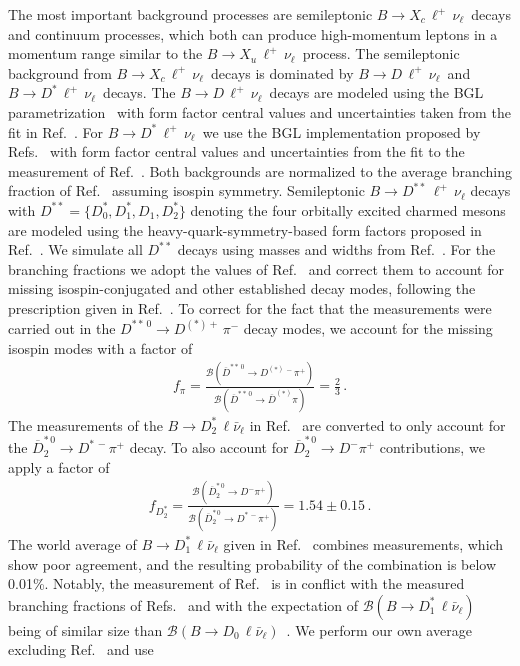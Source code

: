 \documentclass[twocolumn,aps,prd,superscriptaddress,nofootinbib,floatfix,preprintnumbers,a4]{revtex4-1}
\newcommand{\bulnu}{\ensuremath{B \to X_u \, \ell^+\, \nu_{\ell}}\xspace}
\newcommand{\bclnu}{\ensuremath{B \to X_c \, \ell^+\, \nu_{\ell}}\xspace}
\newcommand{\bdlnu}{\ensuremath{B \to D \, \ell^+\,\nu_{\ell}}\xspace}
\newcommand{\bdslnu}{\ensuremath{B \to D^* \, \ell^+\,\nu_{\ell}}\xspace}
\newcommand{\bddslnu}{\ensuremath{B \to D^{**} \, \ell^+\,\nu_{\ell}}\xspace}
\begin{document}
The most important background processes are semileptonic \bclnu\ decays and continuum processes, which both can produce high-momentum leptons in a momentum range similar to the \bulnu\ process. The semileptonic background from \bclnu\ decays is dominated by \bdlnu\ and \bdslnu\ decays. The \bdlnu\ decays are modeled using the BGL parametrization~\cite{Boyd:1994tt} with form factor central values and uncertainties taken from the fit in Ref.~\cite{Glattauer:2015teq}. For \bdslnu\, we use the BGL implementation proposed by Refs.~\cite{Grinstein:2017nlq,Bigi:2017njr} with form factor central values and uncertainties from the fit to the measurement of Ref.~\cite{Waheed:2018djm}. Both backgrounds are normalized to the average branching fraction of Ref.~\cite{Amhis:2019ckw} assuming isospin symmetry. Semileptonic \bddslnu decays with $D^{**} = \{ D_0^*, D_1^*, D_1, D_2^* \}$ denoting the four orbitally excited charmed mesons are modeled using the heavy-quark-symmetry-based form factors proposed in Ref.~\cite{Bernlochner:2016bci}. We simulate all $D^{**}$ decays using masses and widths from Ref.~\cite{pdg:2020}. For the branching fractions we adopt the values of Ref.~\cite{Amhis:2019ckw} and correct them to account for missing isospin-conjugated and other established decay modes, following the prescription given in Ref.~\cite{Bernlochner:2016bci}. To correct for the fact that the measurements were carried out in the $D^{**\,0} \to D^{(*)+} \, \pi^-$ decay modes, we account for the missing isospin modes with a factor of
\begin{align}
 f_\pi = \frac{ \mathcal{B}( \overline D^{**\,0} \to D^{(*)\, -} \pi^+) }{  \mathcal{B}( \overline D^{**\,0} \to \overline D^{(*)} \pi) } =  \frac{2}{3} \, .
\end{align}
The measurements of the $B \to D_2^* \, \ell \bar \nu_\ell$ in Ref.~\cite{Amhis:2019ckw} are converted to only account for the $\overline D_2^{*\,0} \to D^{*\, -} \pi^+$ decay. To also account for $\overline D_2^{*\,0} \to D^{-} \pi^+$ contributions, we apply a factor of~\cite{pdg:2020}
\begin{align}
 f_{D_2^*}  = \frac{ \mathcal{B}(\overline D_2^{*\, 0} \to D^{-} \pi^+) }{ \mathcal{B}(\overline D_2^{*\, 0} \to D^{*\, -} \pi^+) } = 1.54 \pm 0.15  \, .
\end{align}
The world average of $B \to D_1^* \, \ell \bar \nu_\ell$ given in Ref.~\cite{Amhis:2019ckw} combines measurements, which show poor agreement, and the resulting probability of the combination is below 0.01\%. Notably, the measurement of Ref.~\cite{Liventsev:2007rb} is in conflict with the measured branching fractions of Refs.~\cite{Aubert:2008ea,Abdallah:2005cx} and with the expectation of $\mathcal{B}(B \to D_1^* \, \ell \bar \nu_\ell)$ being of similar size than $\mathcal{B}(B \to D_0 \, \ell \bar \nu_\ell)$~\cite{Leibovich:1997em,Bigi:2007qp}. We perform our own average excluding Ref.~\cite{Liventsev:2007rb} and use
\end{document}
